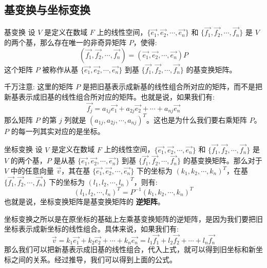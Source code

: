 \documentclass[a4paper,12pt]{ctexart}
\begin{document}
\subsection{基变换与坐标变换}

    \begin{mythm}{基变换}{}
    设 $V$ 是定义在数域 $F$ 上的线性空间，$\{\vec{e_1}, \vec{e_2}, \cdots, \vec{e_n}\}$ 和 $\{\vec{f_1}, \vec{f_2}, \cdots, \vec{f_n}\}$ 是 $V$ 的两个基，那么存在唯一的非奇异矩阵 $P$，使得:
    \[
    (\vec{f_1}, \vec{f_2}, \cdots, \vec{f_n}) = (\vec{e_1}, \vec{e_2}, \cdots, \vec{e_n}) P
    \]
    这个矩阵 $P$ 被称作从基 $\{\vec{e_1}, \vec{e_2}, \cdots, \vec{e_n}\}$ 到基 $\{\vec{f_1}, \vec{f_2}, \cdots, \vec{f_n}\}$ 的基变换矩阵。
    \end{mythm}
    
    \begin{mynote}
    千万注意: 这里的矩阵 $P$ 是把旧基表示成新基的线性组合所对应的矩阵，而不是把新基表示成旧基的线性组合所对应的矩阵。也就是说，如果我们有:
    \[
    \vec{f_j} = a_{1j} \vec{e_1} + a_{2j} \vec{e_2} + \cdots + a_{nj} \vec{e_n}
    \]
    那么矩阵 $P$ 的第 $j$ 列就是 $(a_{1j}, a_{2j}, \cdots, a_{nj})^T$。这也是为什么我们要右乘矩阵 $P$。$P$ 的每一列其实对应的是坐标。
    \end{mynote}

    
    \begin{mythm}{坐标变换}{}
    设 $V$ 是定义在数域 $F$ 上的线性空间，$\{\vec{e_1}, \vec{e_2}, \cdots, \vec{e_n}\}$ 和 $\{\vec{f_1}, \vec{f_2}, \cdots, \vec{f_n}\}$ 是 $V$ 的两个基，$P$ 是从基 $\{\vec{e_1}, \vec{e_2}, \cdots, \vec{e_n}\}$ 到基 $\{\vec{f_1}, \vec{f_2}, \cdots, \vec{f_n}\}$ 的基变换矩阵。那么对于 $V$ 中的任意向量 $\vec{v}$，其在基 $\{\vec{e_1}, \vec{e_2}, \cdots, \vec{e_n}\}$ 下的坐标为 $(k_1, k_2, \cdots, k_n)^T$，在基 $\{\vec{f_1}, \vec{f_2}, \cdots, \vec{f_n}\}$ 下的坐标为 $(l_1, l_2, \cdots, l_n)^T$，则有:
    \[
    (l_1, l_2, \cdots, l_n)^T = P^{-1} (k_1, k_2, \cdots, k_n)^T
    \]
    也就是说，坐标变换矩阵是基变换矩阵的 \textbf{逆矩阵}。
    \end{mythm}
    
    坐标变换之所以是在原坐标的基础上左乘基变换矩阵的逆矩阵，是因为我们要把旧坐标表示成新坐标的线性组合。具体来说，如果我们有:
    \[
    \vec{v} = k_1 \vec{e_1} + k_2 \vec{e_2} + \cdots + k_n \vec{e_n} = l_1 \vec{f_1} + l_2 \vec{f_2} + \cdots + l_n \vec{f_n}
    \]
    那么我们可以把新基表示成旧基的线性组合，代入上式，就可以得到旧坐标和新坐标之间的关系。经过推导，我们可以得到上面的公式。
\end{document}
